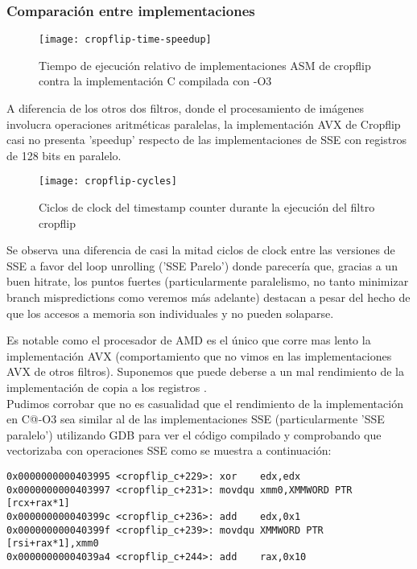 \subsubsection{Comparación entre implementaciones}

\begin{figure}[h]
\centering
\texttt{[image: cropflip-time-speedup]} 
\caption{Tiempo de ejecución relativo de implementaciones ASM de cropflip contra la implementación C compilada con -O3}
\label{fig:cropflip-time-speedup}
\end{figure}

A diferencia de los otros dos filtros, donde el procesamiento de imágenes involucra operaciones aritméticas paralelas, la implementación AVX de Cropflip casi no presenta 'speedup' respecto de las implementaciones de SSE con registros de 128 bits en paralelo.

\begin{figure}[H]
\centering
\texttt{[image: cropflip-cycles]}
\label{fig:cropflip-cycles}
\caption{Ciclos de clock del timestamp counter durante la ejecución del filtro cropflip}
\end{figure}

Se observa una diferencia de casi la mitad ciclos de clock entre las versiones de SSE a favor del loop unrolling ('SSE Parelo') donde parecería que, gracias a un buen hitrate, los puntos fuertes  (particularmente paralelismo, no tanto minimizar branch mispredictions como veremos más adelante) destacan a pesar del hecho de que los accesos a memoria son individuales y no pueden solaparse.

Es notable como el procesador de AMD es el único que corre mas lento la implementación AVX (comportamiento que no vimos en las implementaciones AVX de otros filtros). Suponemos que puede deberse a un mal rendimiento de la implementación de copia a los registros \ymm{}.
\\

Pudimos corrobar que no es casualidad que el rendimiento de la implementación en C@-O3 sea similar al de las implementaciones SSE (particularmente 'SSE paralelo') utilizando GDB para ver el código compilado y comprobando que vectorizaba con operaciones SSE como se muestra a continuación:

\begin{lstlisting}
0x0000000000403995 <cropflip_c+229>: xor    edx,edx
0x0000000000403997 <cropflip_c+231>: movdqu xmm0,XMMWORD PTR [rcx+rax*1]
0x000000000040399c <cropflip_c+236>: add    edx,0x1
0x000000000040399f <cropflip_c+239>: movdqu XMMWORD PTR [rsi+rax*1],xmm0
0x00000000004039a4 <cropflip_c+244>: add    rax,0x10
\end{lstlisting}

